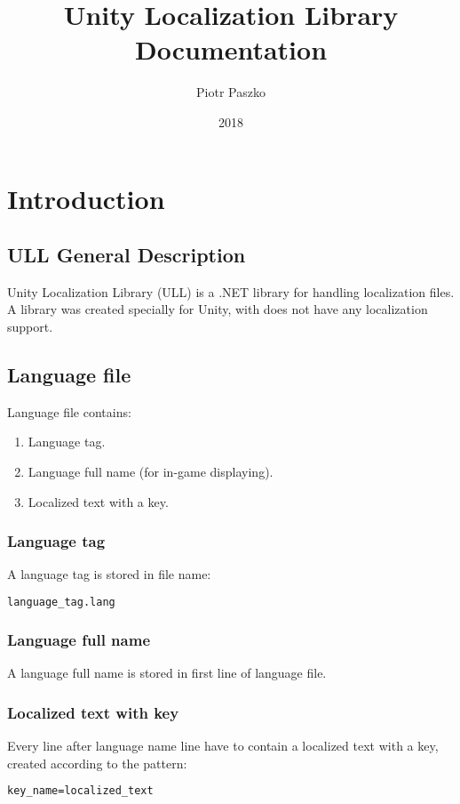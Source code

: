 \documentclass[a4paper]{report}
\title{Unity Localization Library Documentation}
\author{Piotr Paszko}
\date{2018}
\begin{document}
\maketitle

\tableofcontents

\chapter{Introduction}
\section{ULL General Description}
Unity Localization Library (ULL) is a .NET library for handling localization files. A library was created specially for Unity, with does not have any localization support.

\section{Language file}
Language file contains:
\begin{enumerate}
\item Language tag.
\item Language full name (for in-game displaying).
\item Localized text with a key.
\end{enumerate}

\subsection{Language tag}
A language tag is stored in file name:
\begin{lstlisting}[language=XML]
language_tag.lang
\end{lstlisting}

\subsection{Language full name}
A language full name is stored in first line of language file.

\subsection{Localized text with key}
Every line after language name line have to contain a localized text with a key,
created according to the pattern:

\begin{lstlisting}[language=XML]
key_name=localized_text
\end{lstlisting}
\end{document}
